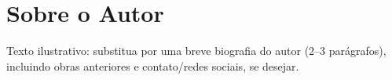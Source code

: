 \chapter*{Sobre o Autor}

Texto ilustrativo: substitua por uma breve biografia do autor (2--3
parágrafos), incluindo obras anteriores e contato/redes sociais, se
desejar.
